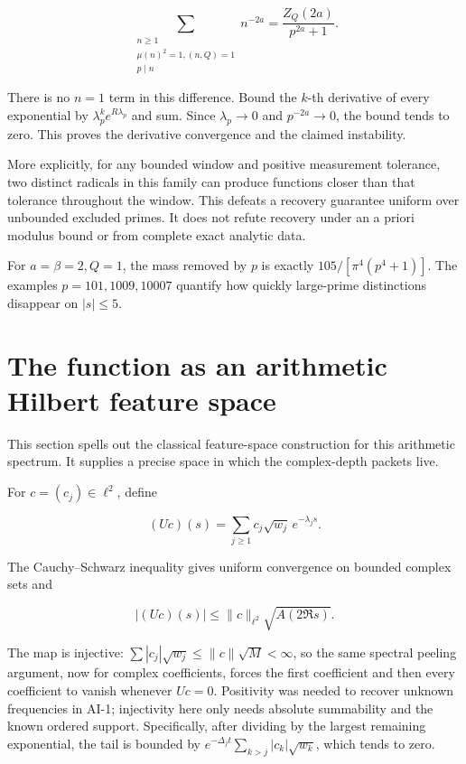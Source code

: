 \[
 \sum_{\substack{n\ge1\\\mu(n)^2=1,(n,Q)=1\\p\mid n}}n^{-2a}
 =\frac{Z_Q(2a)}{p^{2a}+1}.
\]

There is no \(n=1\) term in this difference. Bound the \(k\)-th
derivative of every exponential by \(\lambda_p^ke^{R\lambda_p}\) and
sum. Since \(\lambda_p\to0\) and \(p^{-2a}\to0\), the bound tends to
zero. This proves the derivative convergence and the claimed
instability.

More explicitly, for any bounded window and positive measurement
tolerance, two distinct radicals in this family can produce functions
closer than that tolerance throughout the window. This defeats a
recovery guarantee uniform over unbounded excluded primes. It does not
refute recovery under an a priori modulus bound or from complete exact
analytic data.

For \(a=\beta=2,Q=1\), the mass removed by \(p\) is exactly
\(105/[\pi^4(p^4+1)]\). The examples \(p=101,1009,10007\) quantify how
quickly large-prime distinctions disappear on \(|s|\le5\).

\hypertarget{the-function-as-an-arithmetic-hilbert-feature-space}{%
\section{The function as an arithmetic Hilbert feature
space}\label{the-function-as-an-arithmetic-hilbert-feature-space}}

This section spells out the classical feature-space construction for
this arithmetic spectrum. It supplies a precise space in which the
complex-depth packets live.

For \(c=(c_j)\in\ell^2\), define

\[
 (Uc)(s)=\sum_{j\ge1}c_j\sqrt{w_j}\,e^{-\lambda_js}.
\]

The Cauchy--Schwarz inequality gives uniform convergence on bounded complex sets and

\[
 |(Uc)(s)|\le\|c\|_{\ell^2}\sqrt{A(2\Re s)}.
\]

The map is injective: \(\sum|c_j|\sqrt{w_j}\le\|c\|\sqrt M<\infty\), so
the same spectral peeling argument, now for complex coefficients, forces
the first coefficient and then every coefficient to vanish whenever
\(Uc=0\). Positivity was needed to recover unknown frequencies in AI-1;
injectivity here only needs absolute summability and the known ordered
support. Specifically, after dividing by the largest remaining
exponential, the tail is bounded by
\(e^{-\Delta_jt}\sum_{k>j}|c_k|\sqrt{w_k}\), which tends to zero.

